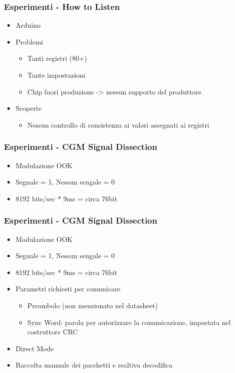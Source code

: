 \documentclass{beamer}
\begin{document}
\begin{frame}
\frametitle{Esperimenti - How to Listen}
	\begin{itemize}
		\item Arduino
		\item Problemi
			\begin{itemize}
				\item Tanti registri (80+)
				\item Tante impostazioni
				\item Chip fuori produzione -> nessun supporto del produttore
			\end{itemize}
		\item Scoperte
			\begin{itemize}
				\item Nessun controllo di consistenza ai valori assegnati ai registri
			\end{itemize}
	\end{itemize}
\end{frame}

\begin{frame}
\frametitle{Esperimenti - CGM Signal Dissection}
	\begin{itemize}
		\item Modulazione OOK
		\item Segnale = 1, Nessun sengale = 0
		\item 8192 bits/sec * 9ms = circa 76bit 
	\end{itemize}
\end{frame}

\begin{frame}
\frametitle{Esperimenti - CGM Signal Dissection}
	\begin{itemize}
		\item Modulazione OOK
		\item Segnale = 1, Nessun sengale = 0
		\item 8192 bits/sec * 9ms = circa 76bit 
		\item Parametri richiesti per comunicare
			\begin{itemize}
				\item Preambolo (non menzionato nel datasheet)
				\item Sync Word: parola per autorizzare la comunicazione, impostata nel costruttore
				\ite CRC 
			\end{itemize}
		\item Direct Mode 
		\item Raccolta manuale dei pacchetti e realtiva decodifica
	\end{itemize}
\end{frame}
\end{document}
